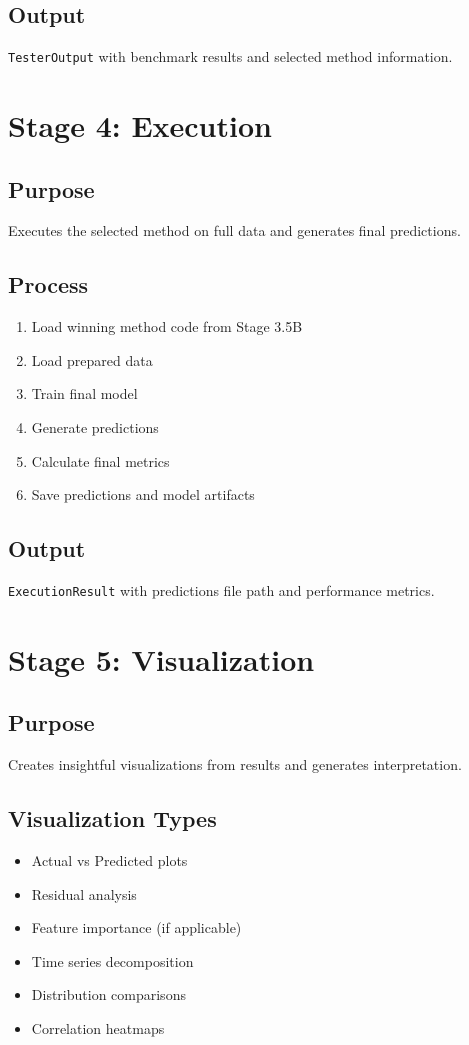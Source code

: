 \documentclass[12pt,a4paper]{report}
\begin{document}
\subsection{Output}
\texttt{TesterOutput} with benchmark results and selected method information.

\section{Stage 4: Execution}
\subsection{Purpose}
Executes the selected method on full data and generates final predictions.

\subsection{Process}
\begin{enumerate}
    \item Load winning method code from Stage 3.5B
    \item Load prepared data
    \item Train final model
    \item Generate predictions
    \item Calculate final metrics
    \item Save predictions and model artifacts
\end{enumerate}

\subsection{Output}
\texttt{ExecutionResult} with predictions file path and performance metrics.

\section{Stage 5: Visualization}
\subsection{Purpose}
Creates insightful visualizations from results and generates interpretation.

\subsection{Visualization Types}
\begin{itemize}
    \item Actual vs Predicted plots
    \item Residual analysis
    \item Feature importance (if applicable)
    \item Time series decomposition
    \item Distribution comparisons
    \item Correlation heatmaps
\end{itemize}
\end{document}
